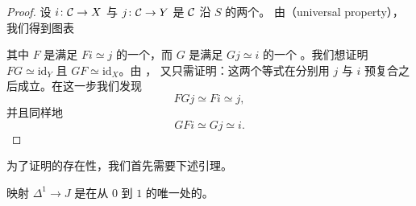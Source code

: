 \begin{proof}
设 $i\colon \mathcal{C} \to X$ 与 $j\colon \mathcal{C} \to Y$ 是 $\mathcal{C}$ 沿 $S$ 的两个\trLocalization{}。
由\trUniversalProperty{}（universal property），我们得到图表
\begin{center}
\end{center}
其中 $F$ 是满足 $Fi \simeq j$ 的一个\trFunctor{}，而 $G$ 是满足 $Gj \simeq i$ 的一个%
\trFunctor{}。我们想证明 $FG \simeq \mathrm{id}_Y$ 且 $GF \simeq \mathrm{id}_X$。由%
\trUniversalProperty{}，
又只需证明：这两个等式在分别用 $j$ 与 $i$ 预复合之后成立。在这一步我们发现
\[
FGj \simeq Fi \simeq j,
\]
并且同样地
\[
GFi \simeq Gj \simeq i.
\]
\end{proof}

为了证明\trLocalization{}的存在性，我们首先需要下述引理。

\begin{lemma}\label{lem:delta1-j-localization}
映射 $\Delta^1 \to J$ 是在从 $0$ 到 $1$ 的唯一\trMorphism{}处的\trLocalization{}。
\end{lemma}

